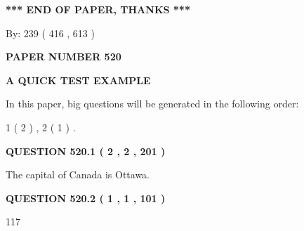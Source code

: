 \documentclass[12pt]{article}
\begin{document}
   
   
   
   
\vspace{1.0in} 
{\textbf{\large{ *** END OF PAPER, THANKS *** }}} 
   
   
\hspace{1.0in} By: 
 239 ( 416 ,  613 )
   
   
   
   
\newpage 
\setcounter{page}{ 
   520001 } 
   
   
   
   
 {\textbf{ \Large{ PAPER NUMBER  520  }}}
   
   
\vspace{0.2in}
   
   
   
   
   
   
 \vspace{0.2in}
{\LARGE {\textbf{ A QUICK TEST EXAMPLE}}}
   
   
   
\vspace{0.2in}
   
In this paper, big questions will be generated in the following order: 
   
   
   1 ( 2 )
 ,
   2 ( 1 )
 .
  
\vspace{0.2in}
  
{\textbf{\Large{QUESTION
520.1 
 ( 2 , 2 , 201 )
}}}
  
  
 
 
\noindent{}
 
 
The capital of Canada is Ottawa.
 
 
 
 
  
\vspace{0.2in}
  
{\textbf{\Large{QUESTION
520.2 
 ( 1 , 1 , 101 )
}}}
  
  
 
 
\noindent{}

117
 
 
 
 
\noindent{}
\end{document}
